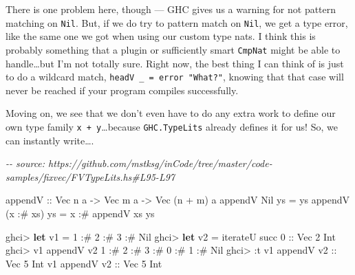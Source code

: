 \documentclass[]{article}
\newenvironment{Shaded}{}{}
\newcommand{\CommentTok}[1]{\textcolor[rgb]{0.38,0.63,0.69}{\textit{#1}}}
\newcommand{\DataTypeTok}[1]{\textcolor[rgb]{0.56,0.13,0.00}{#1}}
\newcommand{\DecValTok}[1]{\textcolor[rgb]{0.25,0.63,0.44}{#1}}
\newcommand{\FunctionTok}[1]{\textcolor[rgb]{0.02,0.16,0.49}{#1}}
\newcommand{\KeywordTok}[1]{\textcolor[rgb]{0.00,0.44,0.13}{\textbf{#1}}}
\newcommand{\NormalTok}[1]{#1}
\newcommand{\OperatorTok}[1]{\textcolor[rgb]{0.40,0.40,0.40}{#1}}
\newcommand{\OtherTok}[1]{\textcolor[rgb]{0.00,0.44,0.13}{#1}}
\begin{document}
There is one problem here, though --- GHC gives us a warning for not pattern
matching on \texttt{Nil}. But, if we do try to pattern match on \texttt{Nil}, we
get a type error, like the same one we got when using our custom type nats. I
think this is probably something that a plugin or sufficiently smart
\texttt{CmpNat} might be able to handle\ldots but I'm not totally sure. Right
now, the best thing I can think of is just to do a wildcard match,
\texttt{headV\ \_\ =\ error\ "What?"}, knowing that that case will never be
reached if your program compiles successfully.

Moving on, we see that we don't even have to do any extra work to define our own
type family \texttt{x\ +\ y}\ldots because \texttt{GHC.TypeLits} already defines
it for us! So, we can instantly write\ldots.

\begin{Shaded}
\begin{Highlighting}[]
\CommentTok{{-}{-} source: https://github.com/mstksg/inCode/tree/master/code{-}samples/fixvec/FVTypeLits.hs\#L95{-}L97}

\OtherTok{appendV ::} \DataTypeTok{Vec}\NormalTok{ n a }\OtherTok{{-}>} \DataTypeTok{Vec}\NormalTok{ m a }\OtherTok{{-}>} \DataTypeTok{Vec}\NormalTok{ (n }\OperatorTok{+}\NormalTok{ m) a}
\NormalTok{appendV }\DataTypeTok{Nil}\NormalTok{       ys }\OtherTok{=}\NormalTok{ ys}
\NormalTok{appendV (x }\OperatorTok{:\#}\NormalTok{ xs) ys }\OtherTok{=}\NormalTok{ x }\OperatorTok{:\#}\NormalTok{ appendV xs ys}
\end{Highlighting}
\end{Shaded}

\begin{Shaded}
\begin{Highlighting}[]
\NormalTok{ghci}\OperatorTok{>} \KeywordTok{let}\NormalTok{ v1 }\OtherTok{=} \DecValTok{1} \OperatorTok{:\#} \DecValTok{2} \OperatorTok{:\#} \DecValTok{3} \OperatorTok{:\#} \DataTypeTok{Nil}
\NormalTok{ghci}\OperatorTok{>} \KeywordTok{let}\NormalTok{ v2 }\OtherTok{=}\NormalTok{ iterateU }\FunctionTok{succ} \DecValTok{0}\OtherTok{ ::} \DataTypeTok{Vec} \DecValTok{2} \DataTypeTok{Int}
\NormalTok{ghci}\OperatorTok{>}\NormalTok{ v1 }\OtherTok{\textasciigrave{}appendV\textasciigrave{}}\NormalTok{ v2}
\DecValTok{1} \OperatorTok{:\#} \DecValTok{2} \OperatorTok{:\#} \DecValTok{3} \OperatorTok{:\#} \DecValTok{0} \OperatorTok{:\#} \DecValTok{1} \OperatorTok{:\#} \DataTypeTok{Nil}
\NormalTok{ghci}\OperatorTok{>} \OperatorTok{:}\NormalTok{t v1 }\OtherTok{\textasciigrave{}appendV\textasciigrave{} v2 ::} \DataTypeTok{Vec} \DecValTok{5} \DataTypeTok{Int}
\NormalTok{v1 }\OtherTok{\textasciigrave{}appendV\textasciigrave{} v2 ::} \DataTypeTok{Vec} \DecValTok{5} \DataTypeTok{Int}
\end{Highlighting}
\end{Shaded}
\end{document}
